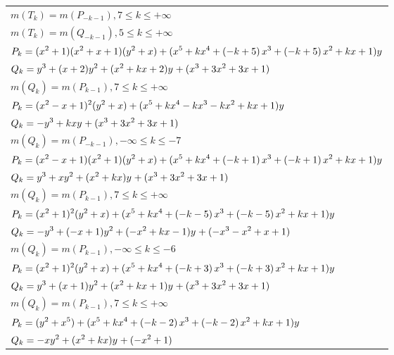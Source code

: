 \documentclass{amsart}
\begin{document}
\begin{longtable}{|l|}
\(\displaystyle m(T_k) = m(P_{-k
 - 1}),7 \leqslant k \leqslant +\infty\)\\
\(\displaystyle m(T_k) = m(Q_{-k
 - 1}),5 \leqslant k \leqslant +\infty\)\\
\hline
\(\displaystyle P_k=(x^2
 + 1)(x^2
 + x
 + 1)(y^2+x)+(x^5
 + k\*x^4
 + \left(-k
 + 5\right) \*x^3
 + \left(-k
 + 5\right) \*x^2
 + k\*x
 + 1)y\)\\
\(\displaystyle Q_k=y^{3}+(x
 + 2)y^{2}+(x^2
 + k\*x
 + 2)y^{}+(x^3
 + 3\*x^2
 + 3\*x
 + 1)\)\\
\(\displaystyle m(Q_k) = m(P_{k
 - 1}),7 \leqslant k \leqslant +\infty\)\\
\hline
\(\displaystyle P_k=(x^2
 - x
 + 1)^{2}(y^2+x)+(x^5
 + k\*x^4
 - k\*x^3
 - k\*x^2
 + k\*x
 + 1)y\)\\
\(\displaystyle Q_k=-y^{3}+k\*xy^{}+(x^3
 + 3\*x^2
 + 3\*x
 + 1)\)\\
\(\displaystyle m(Q_k) = m(P_{-k
 - 1}),-\infty \leqslant k \leqslant -7\)\\
\hline
\(\displaystyle P_k=(x^2
 - x
 + 1)(x^2
 + 1)(y^2+x)+(x^5
 + k\*x^4
 + \left(-k
 + 1\right) \*x^3
 + \left(-k
 + 1\right) \*x^2
 + k\*x
 + 1)y\)\\
\(\displaystyle Q_k=y^{3}+xy^{2}+(x^2
 + k\*x)y^{}+(x^3
 + 3\*x^2
 + 3\*x
 + 1)\)\\
\(\displaystyle m(Q_k) = m(P_{k
 - 1}),7 \leqslant k \leqslant +\infty\)\\
\hline
\(\displaystyle P_k=(x^2
 + 1)^{2}(y^2+x)+(x^5
 + k\*x^4
 + \left(-k
 - 5\right) \*x^3
 + \left(-k
 - 5\right) \*x^2
 + k\*x
 + 1)y\)\\
\(\displaystyle Q_k=-y^{3}+(-x
 + 1)y^{2}+(-x^2
 + k\*x
 - 1)y^{}+(-x^3
 - x^2
 + x
 + 1)\)\\
\(\displaystyle m(Q_k) = m(P_{k
 - 1}),-\infty \leqslant k \leqslant -6\)\\
\hline
\(\displaystyle P_k=(x^2
 + 1)^{2}(y^2+x)+(x^5
 + k\*x^4
 + \left(-k
 + 3\right) \*x^3
 + \left(-k
 + 3\right) \*x^2
 + k\*x
 + 1)y\)\\
\(\displaystyle Q_k=y^{3}+(x
 + 1)y^{2}+(x^2
 + k\*x
 + 1)y^{}+(x^3
 + 3\*x^2
 + 3\*x
 + 1)\)\\
\(\displaystyle m(Q_k) = m(P_{k
 - 1}),7 \leqslant k \leqslant +\infty\)\\
\hline
\(\displaystyle P_k=(y^2+x^5)+(x^5
 + k\*x^4
 + \left(-k
 - 2\right) \*x^3
 + \left(-k
 - 2\right) \*x^2
 + k\*x
 + 1)y\)\\
\(\displaystyle Q_k=-xy^{2}+(x^2
 + k\*x)y^{}+(-x^2
 + 1)\)\\

\end{longtable}
\end{document}
